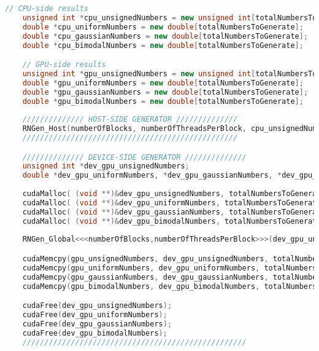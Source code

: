\begin{lstlisting}[language=C++, caption={\texttt{libraries/CoreLibraries/RandomGenerator/OutputTest.cu}}]
	// CPU-side results
	unsigned int *cpu_unsignedNumbers = new unsigned int[totalNumbersToGenerate];
	double *cpu_uniformNumbers = new double[totalNumbersToGenerate];
	double *cpu_gaussianNumbers = new double[totalNumbersToGenerate];
	double *cpu_bimodalNumbers = new double[totalNumbersToGenerate];

	// GPU-side results
	unsigned int *gpu_unsignedNumbers = new unsigned int[totalNumbersToGenerate];
	double *gpu_uniformNumbers = new double[totalNumbersToGenerate];
	double *gpu_gaussianNumbers = new double[totalNumbersToGenerate];
	double *gpu_bimodalNumbers = new double[totalNumbersToGenerate];
	
	////////////// HOST-SIDE GENERATOR //////////////
	RNGen_Host(numberOfBlocks, numberOfThreadsPerBlock, cpu_unsignedNumbers, cpu_uniformNumbers, cpu_gaussianNumbers, cpu_bimodalNumbers, totalNumbersToGenerate, numbersToGeneratePerThread, seed);
	/////////////////////////////////////////////////

	////////////// DEVICE-SIDE GENERATOR //////////////
	unsigned int *dev_gpu_unsignedNumbers;
	double *dev_gpu_uniformNumbers, *dev_gpu_gaussianNumbers, *dev_gpu_bimodalNumbers;
	
	cudaMalloc( (void **)&dev_gpu_unsignedNumbers, totalNumbersToGenerate*sizeof(unsigned int) );
	cudaMalloc( (void **)&dev_gpu_uniformNumbers, totalNumbersToGenerate*sizeof(double) );
	cudaMalloc( (void **)&dev_gpu_gaussianNumbers, totalNumbersToGenerate*sizeof(double) );
	cudaMalloc( (void **)&dev_gpu_bimodalNumbers, totalNumbersToGenerate*sizeof(double) );
	
	RNGen_Global<<<numberOfBlocks,numberOfThreadsPerBlock>>>(dev_gpu_unsignedNumbers, dev_gpu_uniformNumbers, dev_gpu_gaussianNumbers, dev_gpu_bimodalNumbers, totalNumbersToGenerate, numbersToGeneratePerThread, seed);

	cudaMemcpy(gpu_unsignedNumbers, dev_gpu_unsignedNumbers, totalNumbersToGenerate*sizeof(unsigned int), cudaMemcpyDeviceToHost);
	cudaMemcpy(gpu_uniformNumbers, dev_gpu_uniformNumbers, totalNumbersToGenerate*sizeof(double), cudaMemcpyDeviceToHost);
	cudaMemcpy(gpu_gaussianNumbers, dev_gpu_gaussianNumbers, totalNumbersToGenerate*sizeof(double), cudaMemcpyDeviceToHost);
	cudaMemcpy(gpu_bimodalNumbers, dev_gpu_bimodalNumbers, totalNumbersToGenerate*sizeof(double), cudaMemcpyDeviceToHost);

	cudaFree(dev_gpu_unsignedNumbers);
	cudaFree(dev_gpu_uniformNumbers);
	cudaFree(dev_gpu_gaussianNumbers);
	cudaFree(dev_gpu_bimodalNumbers);
	///////////////////////////////////////////////////
	

\end{lstlisting}
